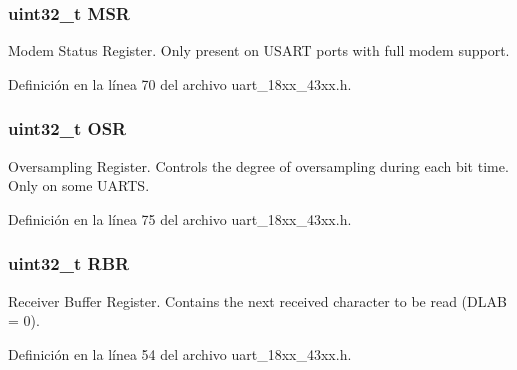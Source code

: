 \subsubsection[{\texorpdfstring{M\+SR}{MSR}}]{ uint32\+\_\+t M\+SR}\hypertarget{struct_l_p_c___u_s_a_r_t___t_abfc6b26f316e5df5ed4648b0d9eab433}{}\label{struct_l_p_c___u_s_a_r_t___t_abfc6b26f316e5df5ed4648b0d9eab433}
Modem Status Register. Only present on U\+S\+A\+RT ports with full modem support. 

Definición en la línea 70 del archivo uart\+\_\+18xx\+\_\+43xx.\+h.

\subsubsection[{\texorpdfstring{O\+SR}{OSR}}]{ uint32\+\_\+t O\+SR}\hypertarget{struct_l_p_c___u_s_a_r_t___t_aeb78312b461e3fc533df44b1cba1e56f}{}\label{struct_l_p_c___u_s_a_r_t___t_aeb78312b461e3fc533df44b1cba1e56f}
Oversampling Register. Controls the degree of oversampling during each bit time. Only on some U\+A\+R\+TS. 

Definición en la línea 75 del archivo uart\+\_\+18xx\+\_\+43xx.\+h.

\subsubsection[{\texorpdfstring{R\+BR}{RBR}}]{ uint32\+\_\+t R\+BR}\hypertarget{struct_l_p_c___u_s_a_r_t___t_a3e6148ef7c298a3bf4982bb640b55470}{}\label{struct_l_p_c___u_s_a_r_t___t_a3e6148ef7c298a3bf4982bb640b55470}
Receiver Buffer Register. Contains the next received character to be read (D\+L\+AB = 0). 

Definición en la línea 54 del archivo uart\+\_\+18xx\+\_\+43xx.\+h.

